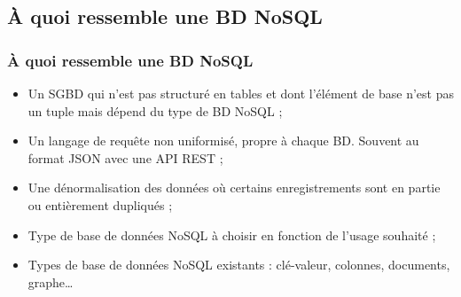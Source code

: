     \subsection{À quoi ressemble une BD NoSQL}
    \begin{frame}
        \frametitle{À quoi ressemble une BD NoSQL}

        \begin{itemize}
            \item Un SGBD qui n'est pas structuré en tables et dont l'élément de base n'est pas un tuple mais dépend du type de BD NoSQL ;
            \item Un langage de requête non uniformisé, propre à chaque BD. Souvent au format JSON avec une API REST ;
            \item Une dénormalisation des données où certains enregistrements sont en partie ou entièrement dupliqués ;
            \item Type de base de données NoSQL à choisir en fonction de l'usage souhaité ;
            \item Types de base de données NoSQL existants : clé-valeur, colonnes, documents, graphe\dots
        \end{itemize}
    \end{frame}
